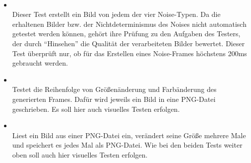 \paragraph{}
\begin{itemize}
	\item{}~\\
	Dieser Test erstellt ein Bild von jedem der vier Noise-Typen. Da die erhaltenen Bilder bzw. der Nichtdeterminismus des Noises nicht automatisch getestet werden können, gehört ihre Prüfung zu den Aufgaben des Testers, der durch ``Hinsehen'' die Qualität der verarbeiteten Bilder bewertet. Dieser Test überprüft nur, ob für das Erstellen eines Noise-Frames höchstens 200ms gebraucht werden.
	
	\item{}~\\
	Testet die Reihenfolge von Größenänderung und Farbänderung des generierten Frames. Dafür wird jeweils ein Bild in eine PNG-Datei geschrieben. Es soll hier auch visuelles Testen erfolgen.
	
	\item{}~\\
	Liest ein Bild aus einer PNG-Datei ein, verändert seine Größe mehrere Male und speichert es jedes Mal als PNG-Datei. Wie bei den beiden Tests weiter oben soll auch hier visuelles Testen erfolgen.
	
\end{itemize}

\paragraph{}

